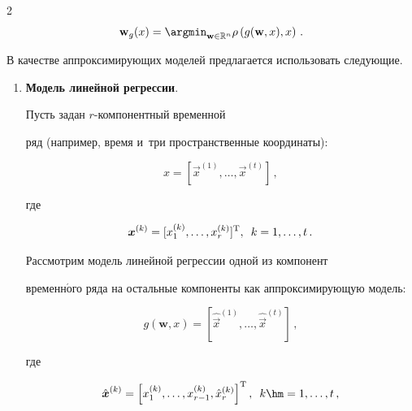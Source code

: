 \begin{multicols}{2}
\begin{equation}
\mathbf{w}_g(x)=


\argmin_{\mathbf{w}\in \mathbb{R}^n} \rho\left(g(\mathbf{w},x),x\right)\,.


\end{equation}








В качестве аппроксимирующих моделей предлагается использовать следующие.


\begin{enumerate}[1.]


\item \textbf{Модель линейной регрессии}.


Пусть задан $r$-ком\-по\-нент\-ный временной 


ряд (например, время и~три пространственные координаты):


$$


x = [\vec{x}^{(1)}, \dots, \vec{x}^{(t)}]\,,


$$


где


$$


\vec{x}^{(k)}=[x_1^{(k)},\dots,x_r^{(k)}]^{\mathrm{T}},\enskip k=1,\dots,t\,.


$$


Рассмотрим модель линейной регрессии одной из компонент 


временн$\acute{\mbox{о}}$го ряда на остальные компоненты как аппроксимирующую модель:


$$


g(\mathbf{w},x)=\left[\hat{\vec{x}}^{(1)},\dots,\hat{\vec{x}}^{(t)}\right]\,,


$$


 где 


 $$


\hat{\vec{x}}^{(k)}=\left[x_1^{(k)},\dots,x_{r-1}^{(k)},\hat{x}_r^{(k)}\right]^{\mathrm{T}},\enskip 


k\hm=1,\dots,t\,,


$$


$$


\end{enumerate}
\end{multicols}
